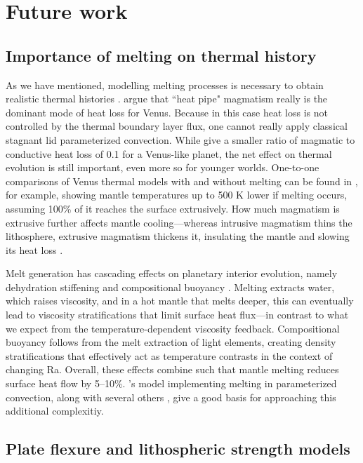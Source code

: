 \section{Future work}

\subsection{Importance of melting on thermal history}

As we have mentioned, modelling melting processes is necessary to obtain realistic thermal histories \citep{Nakagawa2012}. \citet{Armann2012} argue that ``heat pipe" magmatism really is the dominant mode of heat loss for Venus. Because in this case heat loss is not controlled by the thermal boundary layer flux, one cannot really apply classical stagnant lid parameterized convection. While \citet{Kite2009} give a smaller ratio of magmatic to conductive heat loss of 0.1 for a Venus-like planet, the net effect on thermal evolution is still important, even more so for younger worlds. One-to-one comparisons of Venus thermal models with and without melting can be found in \citet{Driscoll2014}, for example, showing mantle temperatures up to 500 K lower if melting occurs, assuming 100\% of it reaches the surface extrusively. How much magmatism is extrusive further affects mantle cooling---whereas intrusive magmatism thins the lithosphere, extrusive magmatism thickens it, insulating the mantle and slowing its heat loss \citep{Lourenco2018}.

Melt generation has cascading effects on planetary interior evolution, namely dehydration stiffening and compositional buoyancy \citep{Korenaga2009}. Melting extracts water, which raises viscosity, and in a hot mantle that melts deeper, this can eventually lead to viscosity stratifications that limit surface heat flux---in contrast to what we expect from the temperature-dependent viscosity feedback. Compositional buoyancy follows from the melt extraction of light elements, creating density stratifications that effectively act as temperature contrasts in the context of changing Ra. Overall, these effects combine such that mantle melting reduces surface heat flow by 5--10\%. \citeauthor{Korenaga2009}'s model \citeyear{Korenaga2009} implementing melting in parameterized convection, along with several others \citep{Kite2009, Driscoll2014, Tosi2017, Foley2018}, give a good basis for approaching this additional complexitiy. 


\subsection{Plate flexure and lithospheric strength models} \label{sec:future-elastic}

